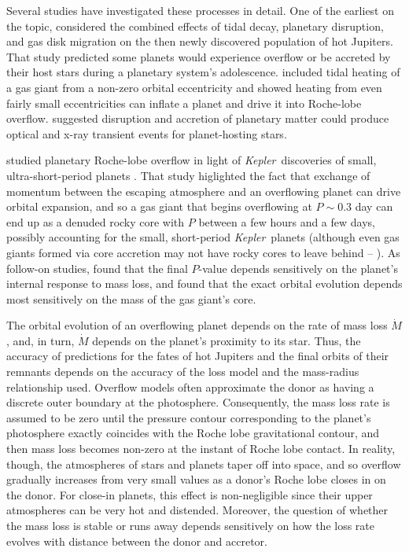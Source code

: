 \documentclass{aastex}
\newcommand{\kepler}{{\it Kepler}}
\begin{document}
Several studies have investigated these processes in detail. One of the earliest on the topic, \citet{1998ApJ...500..428T} considered the combined effects of tidal decay, planetary disruption, and gas disk migration on the then newly discovered population of hot Jupiters. That study predicted some planets would experience overflow or be accreted by their host stars during a planetary system's adolescence. \citet{2003ApJ...588..509G} included tidal heating of a gas giant from a non-zero orbital eccentricity and showed heating from even fairly small eccentricities can inflate a planet and drive it into Roche-lobe overflow. \citet{2012MNRAS.425.2778M} suggested disruption and accretion of planetary matter could produce optical and x-ray transient events for planet-hosting stars. 

%
\citet{2014ApJ...793L...3V} studied planetary Roche-lobe overflow in light of \kepler\ discoveries of small, ultra-short-period planets \citep{2013ApJ...779..165J, 2014ApJ...787...47S, 2016arXiv160306488A}. That study higlighted the fact that exchange of momentum between the escaping atmosphere and an overflowing planet can drive orbital expansion, and so a gas giant that begins overflowing at $P \sim 0.3$ day can end up as a denuded rocky core with $P$ between a few hours and a few days, possibly accounting for the small, short-period \kepler\ planets (although even gas giants formed via core accretion may not have rocky cores to leave behind -- \citealp{2012ApJ...745...54W}). As follow-on studies, \citet{2015ApJ...813..101V} found that the final $P$-value depends sensitively on the planet's internal response to mass loss, and \citet{2016arXiv160300392J} found that the exact orbital evolution depends most sensitively on the mass of the gas giant's core.

The orbital evolution of an overflowing planet depends on the rate of mass loss $\dot{M}$, and, in turn, $\dot{M}$ depends on the planet's proximity to its star. Thus, the accuracy of predictions for the fates of hot Jupiters and the final orbits of their remnants depends on the accuracy of the loss model and the mass-radius relationship used. Overflow models often approximate the donor as having a discrete outer boundary at the photosphere. Consequently, the mass loss rate is assumed to be zero until the pressure contour corresponding to the planet's photosphere exactly coincides with the Roche lobe gravitational contour, and then mass loss becomes non-zero at the instant of Roche lobe contact. In reality, though, the atmospheres of stars and planets taper off into space, and so overflow gradually increases from very small values as a donor's Roche lobe closes in on the donor. For close-in planets, this effect is non-negligible since their upper atmospheres can be very hot and distended. Moreover, the question of whether the mass loss is stable or runs away depends sensitively on how the loss rate evolves with distance between the donor and accretor.
\end{document}
